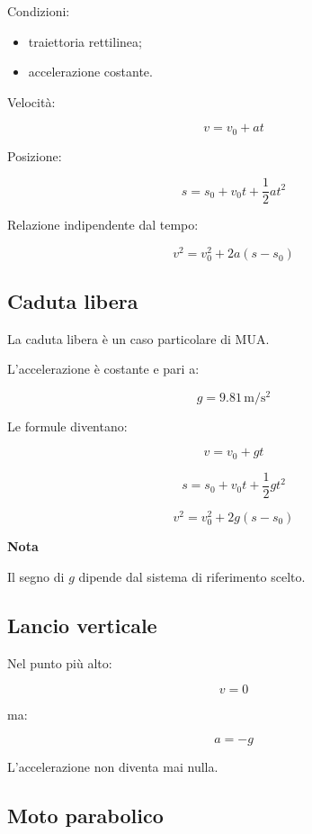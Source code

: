 Condizioni:

\begin{itemize}
\item traiettoria rettilinea;
\item accelerazione costante.
\end{itemize}

\noindent Velocità:

\[
v=v_0+at
\]

\noindent Posizione:

\[
s=s_0+v_0t+\frac{1}{2}at^2
\]

\noindent Relazione indipendente dal tempo:

\[
v^2=v_0^2+2a(s-s_0)
\]

\vspace{0.3cm}

\subsection{Caduta libera}

La caduta libera è un caso particolare di MUA.

\noindent L'accelerazione è costante e pari a:

\[
g=9.81\,\mathrm{m/s^2}
\]

\noindent Le formule diventano:

\[
v=v_0+gt
\]

\[
s=s_0+v_0t+\frac{1}{2}gt^2
\]

\[
v^2=v_0^2+2g(s-s_0)
\]

\textbf{Nota}

Il segno di $g$ dipende dal sistema di riferimento scelto.

\vspace{0.3cm}

\subsection{Lancio verticale}

Nel punto più alto:

\[
v=0
\]

\noindent ma:

\[
a=-g
\]

\noindent L'accelerazione non diventa mai nulla.

\vspace{0.3cm}

\subsection{Moto parabolico}

